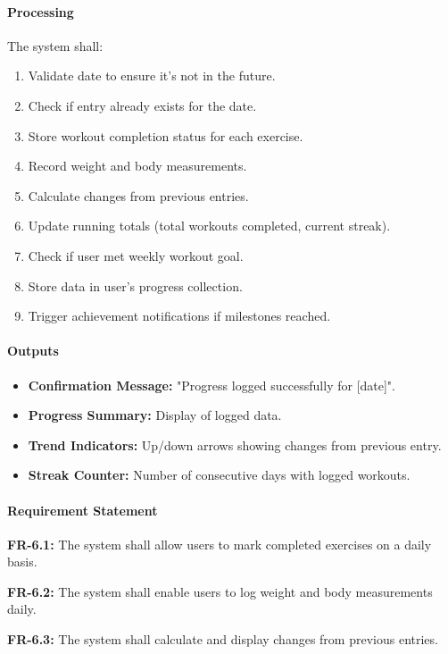 \documentclass[12pt,a4paper]{article}
\begin{document}
\paragraph{Processing}
The system shall:
\begin{enumerate}
    \item Validate date to ensure it's not in the future.
    \item Check if entry already exists for the date.
    \item Store workout completion status for each exercise.
    \item Record weight and body measurements.
    \item Calculate changes from previous entries.
    \item Update running totals (total workouts completed, current streak).
    \item Check if user met weekly workout goal.
    \item Store data in user's progress collection.
    \item Trigger achievement notifications if milestones reached.
\end{enumerate}

\paragraph{Outputs}
\begin{itemize}
    \item \textbf{Confirmation Message:} "Progress logged successfully for [date]".
    \item \textbf{Progress Summary:} Display of logged data.
    \item \textbf{Trend Indicators:} Up/down arrows showing changes from previous entry.
    \item \textbf{Streak Counter:} Number of consecutive days with logged workouts.
\end{itemize}

\paragraph{Requirement Statement}
\textbf{FR-6.1:} The system shall allow users to mark completed exercises on a daily basis.

\textbf{FR-6.2:} The system shall enable users to log weight and body measurements daily.

\textbf{FR-6.3:} The system shall calculate and display changes from previous entries.
\end{document}
